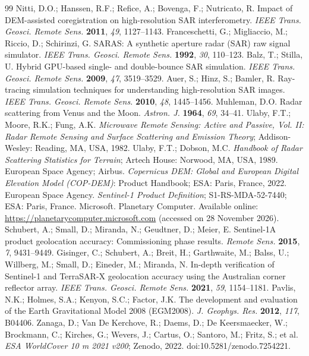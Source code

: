 \documentclass[10pt,a4paper]{article}
\begin{document}
{\begin{thebibliography}{99}
 Nitti, D.O.; Hanssen, R.F.; Refice, A.; Bovenga, F.; Nutricato, R. Impact of DEM-assisted coregistration on high-resolution SAR interferometry. \textit{IEEE Trans. Geosci. Remote Sens.} \textbf{2011}, \textit{49}, 1127--1143.
 Franceschetti, G.; Migliaccio, M.; Riccio, D.; Schirinzi, G. SARAS: A synthetic aperture radar (SAR) raw signal simulator. \textit{IEEE Trans. Geosci. Remote Sens.} \textbf{1992}, \textit{30}, 110--123.
 Balz, T.; Stilla, U. Hybrid GPU-based single- and double-bounce SAR simulation. \textit{IEEE Trans. Geosci. Remote Sens.} \textbf{2009}, \textit{47}, 3519--3529.
 Auer, S.; Hinz, S.; Bamler, R. Ray-tracing simulation techniques for understanding high-resolution SAR images. \textit{IEEE Trans. Geosci. Remote Sens.} \textbf{2010}, \textit{48}, 1445--1456.
 Muhleman, D.O. Radar scattering from Venus and the Moon. \textit{Astron. J.} \textbf{1964}, \textit{69}, 34--41.
 Ulaby, F.T.; Moore, R.K.; Fung, A.K. \textit{Microwave Remote Sensing: Active and Passive, Vol. II: Radar Remote Sensing and Surface Scattering and Emission Theory}; Addison-Wesley: Reading, MA, USA, 1982.
 Ulaby, F.T.; Dobson, M.C. \textit{Handbook of Radar Scattering Statistics for Terrain}; Artech House: Norwood, MA, USA, 1989.
 European Space Agency; Airbus. \textit{Copernicus DEM: Global and European Digital Elevation Model (COP-DEM)}: Product Handbook; ESA: Paris, France, 2022.
 European Space Agency. \textit{Sentinel-1 Product Definition}; S1-RS-MDA-52-7440; ESA: Paris, France.
 Microsoft. Planetary Computer. Available online: \url{https://planetarycomputer.microsoft.com} (accessed on 28 November 2026).
 Schubert, A.; Small, D.; Miranda, N.; Geudtner, D.; Meier, E. Sentinel-1A product geolocation accuracy: Commissioning phase results. \textit{Remote Sens.} \textbf{2015}, \textit{7}, 9431--9449.
 Gisinger, C.; Schubert, A.; Breit, H.; Garthwaite, M.; Balss, U.; Willberg, M.; Small, D.; Eineder, M.; Miranda, N. In-depth verification of Sentinel-1 and TerraSAR-X geolocation accuracy using the Australian corner reflector array. \textit{IEEE Trans. Geosci. Remote Sens.} \textbf{2021}, \textit{59}, 1154--1181.
 Pavlis, N.K.; Holmes, S.A.; Kenyon, S.C.; Factor, J.K. The development and evaluation of the Earth Gravitational Model 2008 (EGM2008). \textit{J. Geophys. Res.} \textbf{2012}, \textit{117}, B04406.
 Zanaga, D.; Van De Kerchove, R.; Daems, D.; De Keersmaecker, W.; Brockmann, C.; Kirches, G.; Wevers, J.; Cartus, O.; Santoro, M.; Fritz, S.; et al. \textit{ESA WorldCover 10 m 2021 v200}; Zenodo, 2022. doi:10.5281/zenodo.7254221.

\end{thebibliography}}
\end{document}
